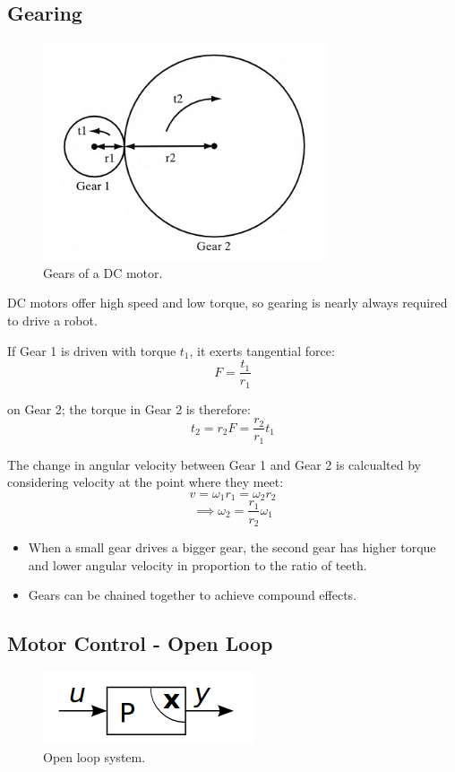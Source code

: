 \documentclass[11pt]{article}
\begin{document}
\subsection{Gearing}
\begin{figure}[h]
  \caption{Gears of a DC motor.}
  \includegraphics[scale=0.5]{gearing}
  \centering
\end{figure}

DC motors offer high speed and low torque, so gearing is nearly always required to drive a robot.

If Gear 1 is driven with torque $t_1$, it exerts tangential force:
\[
  F = \frac{t_1}{r_1}
\]

on Gear 2; the torque in Gear 2 is therefore:
\[
  t_2 = r_2F = \frac{r_2}{r_1}t_1
\]

The change in angular velocity between Gear 1 and Gear 2 is calcualted by considering velocity at the point where they meet:
\[
  v = \omega_1 r_1 = \omega_2 r_2
\]
\[
  \implies \omega_2 = \frac{r_1}{r_2}\omega_1
\]
\begin{itemize}
  \item When a small gear drives a bigger gear, the second gear has higher torque and lower angular velocity in proportion to the ratio of teeth.
  \item Gears can be chained together to achieve compound effects.
\end{itemize}

\subsection{Motor Control - Open Loop}
\begin{figure}[h]
  \caption{Open loop system.}
  \includegraphics[scale=0.4]{openloop}
  \centering
\end{figure}
\end{document}
